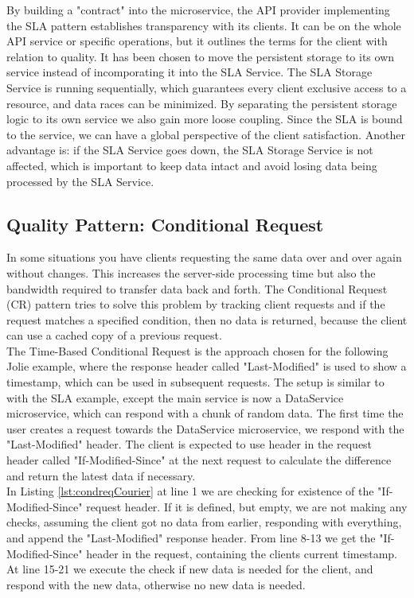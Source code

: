 \documentclass[12pt]{article}
\begin{document}
By building a "contract" into the microservice, the API provider implementing the SLA pattern establishes transparency with its clients. It can be on the whole API service or specific operations, but it outlines the terms for the client with relation to quality. It has been chosen to move the persistent storage to its own service instead of incomporating it into the SLA Service. The SLA Storage Service is running sequentially, which guarantees every client exclusive access to a resource, and data races can be minimized. By separating the persistent storage logic to its own service we also gain more loose coupling. Since the SLA is bound to the service, we can have a global perspective of the client satisfaction. Another advantage is: if the SLA Service goes down, the SLA Storage Service is not affected, which is important to keep data intact and avoid losing data being processed by the SLA Service. 

\subsection{Quality Pattern: Conditional Request}
In some situations you have clients requesting the same data over and over again without changes. This increases the server-side processing time but also the bandwidth required to transfer data back and forth. The Conditional Request (CR) pattern tries to solve this problem by tracking client requests and if the request matches a specified condition, then no data is returned, because the client can use a cached copy of a previous request. \\

The Time-Based Conditional Request \cite{CondReqMAPI} is the approach chosen for the following Jolie example, where the response header called "Last-Modified" is used to show a timestamp, which can be used in subsequent requests. The setup is similar to with the SLA example, except the main service is now a DataService microservice, which can respond with a chunk of random data. The first time the user creates a request towards the DataService microservice, we respond with the "Last-Modified" header. The client is expected to use header in the request header called "If-Modified-Since" \cite{CondReqRFC} at the next request to calculate the difference and return the latest data if necessary.\\
In Listing \ref{lst:condreqCourier} at line 1 we are checking for existence of the "If-Modified-Since" request header. If it is defined, but empty, we are not making any checks, assuming the client got no data from earlier, responding with everything, and append the "Last-Modified" response header. From line 8-13 we get the "If-Modified-Since" header in the request, containing the clients current timestamp. At line 15-21 we execute the check if new data is needed for the client, and respond with the new data, otherwise no new data is needed. \\
\end{document}

